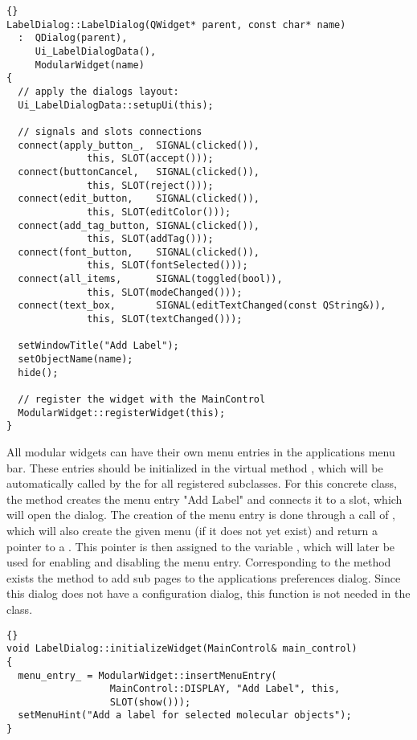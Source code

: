 \begin{lstlisting}{}
LabelDialog::LabelDialog(QWidget* parent, const char* name)
  :  QDialog(parent),
     Ui_LabelDialogData(),
     ModularWidget(name)
{
  // apply the dialogs layout:
  Ui_LabelDialogData::setupUi(this);

  // signals and slots connections
  connect(apply_button_,  SIGNAL(clicked()),
              this, SLOT(accept()));
  connect(buttonCancel,   SIGNAL(clicked()),
              this, SLOT(reject()));
  connect(edit_button,    SIGNAL(clicked()),
              this, SLOT(editColor()));
  connect(add_tag_button, SIGNAL(clicked()),
              this, SLOT(addTag()));
  connect(font_button,    SIGNAL(clicked()),
              this, SLOT(fontSelected()));
  connect(all_items,      SIGNAL(toggled(bool)),
              this, SLOT(modeChanged()));
  connect(text_box,       SIGNAL(editTextChanged(const QString&)),
              this, SLOT(textChanged()));

  setWindowTitle("Add Label");
  setObjectName(name);
  hide();

  // register the widget with the MainControl
  ModularWidget::registerWidget(this);
}
\end{lstlisting}

All modular widgets can have their own menu entries in the applications menu 
bar. These entries should be initialized in the virtual method 
, which will be automatically called by the 
 for all registered  subclasses. 
For this concrete class, the method creates the menu entry "Add Label" and 
connects it to a slot, which will open the dialog. The creation of the menu 
entry is done through a call of , which will also 
create the given menu (if it does not yet exist) and return a pointer to a 
. This pointer is then assigned to the variable , 
which will later be used for enabling and disabling the menu entry.
Corresponding to the method  exists the 
 method to add sub pages to the applications 
preferences dialog. Since this dialog does not have a configuration dialog, 
this function is not needed in the  class.

\begin{lstlisting}{}
void LabelDialog::initializeWidget(MainControl& main_control)
{
  menu_entry_ = ModularWidget::insertMenuEntry(
                  MainControl::DISPLAY, "Add Label", this,
                  SLOT(show()));
  setMenuHint("Add a label for selected molecular objects");   
}
\end{lstlisting}

